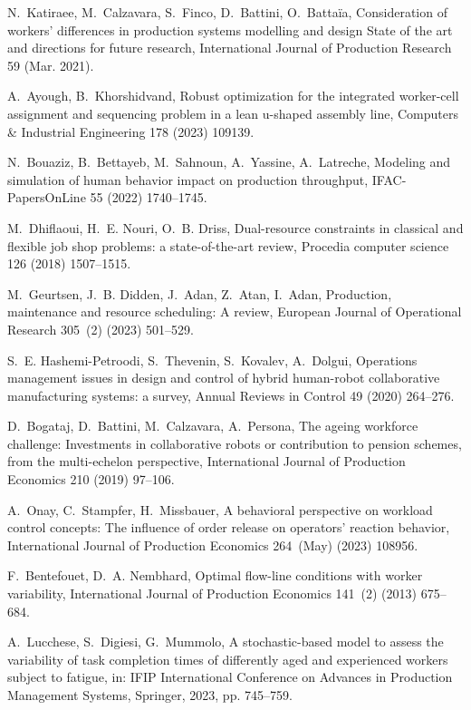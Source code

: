 \documentclass[review,12pt, 3p, times]{elsarticle}
\begin{document}
\begin{thebibliography}{10}
	N.~Katiraee, M.~Calzavara, S.~Finco, D.~Battini, O.~Battaïa, Consideration of
	workers’ differences in production systems modelling and design {State} of
	the art and directions for future research, International Journal of
	Production Research 59 (Mar. 2021).
	
	A.~Ayough, B.~Khorshidvand, Robust optimization for the integrated worker-cell
	assignment and sequencing problem in a lean u-shaped assembly line, Computers
	\& Industrial Engineering 178 (2023) 109139.
	
	N.~Bouaziz, B.~Bettayeb, M.~Sahnoun, A.~Yassine, A.~Latreche, Modeling and
	simulation of human behavior impact on production throughput,
	IFAC-PapersOnLine 55 (2022) 1740--1745.
	
	M.~Dhiflaoui, H.~E. Nouri, O.~B. Driss, Dual-resource constraints in classical
	and flexible job shop problems: a state-of-the-art review, Procedia computer
	science 126 (2018) 1507--1515.
	
	M.~Geurtsen, J.~B. Didden, J.~Adan, Z.~Atan, I.~Adan, Production, maintenance
	and resource scheduling: A review, European Journal of Operational Research
	305~(2) (2023) 501--529.
	
	S.~E. Hashemi-Petroodi, S.~Thevenin, S.~Kovalev, A.~Dolgui, Operations
	management issues in design and control of hybrid human-robot collaborative
	manufacturing systems: a survey, Annual Reviews in Control 49 (2020)
	264--276.
	
	D.~Bogataj, D.~Battini, M.~Calzavara, A.~Persona, {The ageing workforce
		challenge: Investments in collaborative robots or contribution to pension
		schemes, from the multi-echelon perspective}, International Journal of
	Production Economics 210 (2019) 97--106.
	
	A.~Onay, C.~Stampfer, H.~Missbauer, {A behavioral perspective on workload
		control concepts: The influence of order release on operators' reaction
		behavior}, International Journal of Production Economics 264~(May) (2023)
	108956.
	
	F.~Bentefouet, D.~A. Nembhard, {Optimal flow-line conditions with worker
		variability}, International Journal of Production Economics 141~(2) (2013)
	675--684.
	
	A.~Lucchese, S.~Digiesi, G.~Mummolo, A stochastic-based model to assess the
	variability of task completion times of differently aged and experienced
	workers subject to fatigue, in: IFIP International Conference on Advances in
	Production Management Systems, Springer, 2023, pp. 745--759.
	

\end{thebibliography}
\end{document}
